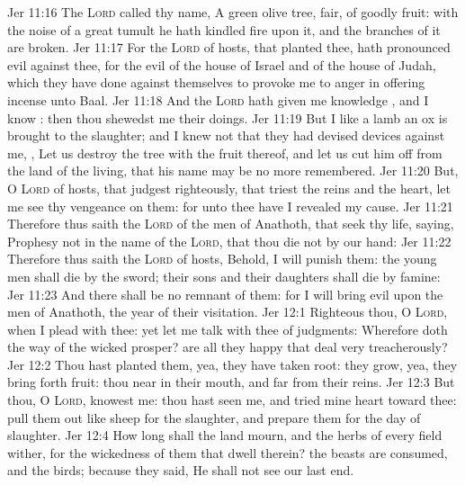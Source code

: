 \vs Jer 11:16 The \textsc{Lord} called thy name, A green olive tree, fair,  of goodly fruit: with the noise of a great tumult he hath kindled fire upon it, and the branches of it are broken.
\vs Jer 11:17 For the \textsc{Lord} of hosts, that planted thee, hath pronounced evil against thee, for the evil of the house of Israel and of the house of Judah, which they have done against themselves to provoke me to anger in offering incense unto Baal.
\vs Jer 11:18 And the \textsc{Lord} hath given me knowledge , and I know : then thou shewedst me their doings.
\vs Jer 11:19 But I  like a lamb  an ox  is brought to the slaughter; and I knew not that they had devised devices against me, , Let us destroy the tree with the fruit thereof, and let us cut him off from the land of the living, that his name may be no more remembered.
\vs Jer 11:20 But, O \textsc{Lord} of hosts, that judgest righteously, that triest the reins and the heart, let me see thy vengeance on them: for unto thee have I revealed my cause.
\vs Jer 11:21 Therefore thus saith the \textsc{Lord} of the men of Anathoth, that seek thy life, saying, Prophesy not in the name of the \textsc{Lord}, that thou die not by our hand:
\vs Jer 11:22 Therefore thus saith the \textsc{Lord} of hosts, Behold, I will punish them: the young men shall die by the sword; their sons and their daughters shall die by famine:
\vs Jer 11:23 And there shall be no remnant of them: for I will bring evil upon the men of Anathoth,  the year of their visitation.
\vs Jer 12:1 Righteous  thou, O \textsc{Lord}, when I plead with thee: yet let me talk with thee of  judgments: Wherefore doth the way of the wicked prosper?  are all they happy that deal very treacherously?
\vs Jer 12:2 Thou hast planted them, yea, they have taken root: they grow, yea, they bring forth fruit: thou  near in their mouth, and far from their reins.
\vs Jer 12:3 But thou, O \textsc{Lord}, knowest me: thou hast seen me, and tried mine heart toward thee: pull them out like sheep for the slaughter, and prepare them for the day of slaughter.
\vs Jer 12:4 How long shall the land mourn, and the herbs of every field wither, for the wickedness of them that dwell therein? the beasts are consumed, and the birds; because they said, He shall not see our last end.
